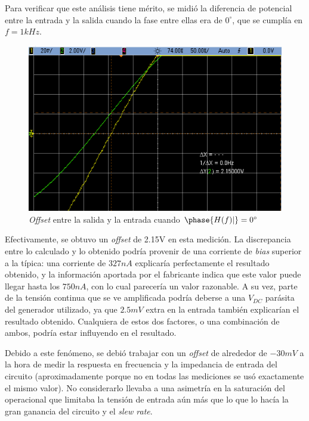 \documentclass[../../main.tex]{subfiles}
\begin{document}
Para  verificar que este an\'alisis tiene m\'erito, se midi\'o la diferencia de potencial entre la entrada y la salida cuando la fase entre ellas era de $0^\circ$, que se cumpl\'ia en $f=1kHz$.

\begin{figure} [H]
	\centering
	\includegraphics[scale=0.5]{fotos/tc_tp2_ej2_offset.png}
	\caption{\textit{Offset} entre la salida y la entrada cuando $\phase{H(f)|}=0^\circ$}
\end{figure}

Efectivamente, se obtuvo un \textit{offset} de 2.15V en esta medici\'on. La discrepancia entre lo calculado y lo obtenido podr\'ia provenir de una corriente de \textit{bias} superior a la t\'ipica: una corriente de $327nA$ explicar\'ia perfectamente el resultado obtenido, y la informaci\'on aportada por el fabricante indica que este valor puede llegar hasta los $750nA$, con lo cual parecer\'ia un valor razonable. A su vez, parte de la tensi\'on continua que se ve amplificada podr\'ia deberse a una $V_{DC}$ par\'asita del generador utilizado, ya que $2.5mV$ extra en la entrada tambi\'en explicar\'ian el resultado obtenido. Cualquiera de estos dos factores, o una combinaci\'on de ambos, podr\'ia estar influyendo en el resultado.\par

Debido a este fen\'omeno, se debi\'o trabajar con un \textit{offset} de alrededor de $-30mV$ a la hora de medir la respuesta en frecuencia y la impedancia de entrada del circuito (aproximadamente porque no en todas las mediciones se us\'o exactamente el mismo valor). No considerarlo llevaba a una asimetr\'ia en la saturaci\'on del operacional que limitaba la tensi\'on de entrada a\'un m\'as que lo que lo hac\'ia la gran ganancia del circuito y el \textit{slew rate}. \par
\end{document}

